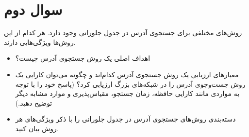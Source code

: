 \section{سوال دوم}

روش‌های مختلفی برای جستجوی آدرس  در جدول جلورانی وجود دارد. هر کدام از این روش‌ها ویژگی‌هایی دارند.


\begin{itemize}
	\item اهداف اصلی یک روش جستجوی آدرس  چیست؟
	
	\begin{qsolve}
		
	\end{qsolve}
	
	
	\item معیارهای ارزیابی یک روش جستجوی آدرس  کدام‌اند و چگونه می‌توان کارایی یک روش جست‌و‌جوی آدرس  را در شبکه‌های بزرگ ارزیابی کرد؟ (پاسخ خود را با توجه به مواردی مانند کارایی حافظه، زمان جستجو، مقیاس‌پذیری و موارد مشابه دیگر توضیح دهید.)
	
	\begin{qsolve}
		
	\end{qsolve}
	
	\item  دسته‌بندی روش‌های جستجوی آدرس  در جدول جلورانی را با ذکر ویژگی‌های هر روش بیان کنید.
	\begin{qsolve}
		
	\end{qsolve}

\end{itemize}